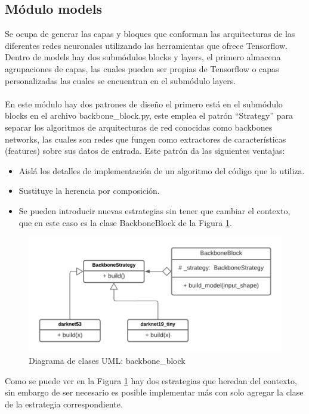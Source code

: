 \subsection{Módulo models}
Se ocupa de generar las capas y bloques que conforman las arquitecturas de las diferentes redes neuronales utilizando las herramientas que ofrece Tensorflow. Dentro de models hay dos submódulos blocks y layers, el primero almacena agrupaciones de capas, las cuales pueden ser propias de Tensorflow o capas personalizadas las cuales se encuentran en el submódulo layers. 
\\
\\
En este módulo hay dos patrones de diseño el primero está en el submódulo blocks en el archivo backbone\_block.py, este emplea el patrón ``Strategy'' para separar los algoritmos de arquitecturas de red conocidas como backbones networks, las cuales son redes que fungen como extractores de características (features) sobre sus datos de entrada. Este patrón da las siguientes ventajas:
\begin{itemize}
    \item Aislá los detalles de implementación de un algoritmo del código que lo utiliza.
    \item Sustituye la herencia por composición.
    \item Se pueden introducir nuevas estrategias sin tener que cambiar el contexto, que en este caso es la clase BackboneBlock de la Figura \ref{backbone_block_uml}.
\end{itemize}
\begin{figure}[H]
    \centering
    \includegraphics[scale=0.5]{Recursos/backbone_block_uml.png}
    \caption{Diagrama de clases UML: backbone\_block}
    \label{backbone_block_uml}
\end{figure}
Como se puede ver en la Figura \ref{backbone_block_uml} hay dos estrategias que heredan del contexto, sin embargo de ser necesario es posible implementar más con solo agregar la clase de la estrategia correspondiente.
